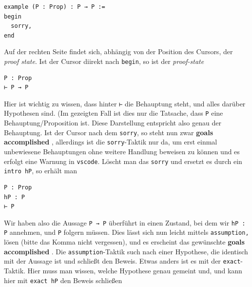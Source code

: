\documentclass[11pt]{article}
\newcommand{\leanin}{\texttt}
\newcommand{\leanstate}{\texttt}
\begin{document}
\begin{verbatim}
example (P : Prop) : P → P := 
begin
  sorry,
end
\end{verbatim}
Auf der rechten Seite findet sich, abhängig von der Position des Cursors, der {\em proof state}. Ist der Cursor diirekt nach \leanstate{begin}, so ist der {\em proof-state}
\begin{verbatim}
P : Prop
⊢ P → P
\end{verbatim}
Hier ist wichtig zu wissen, dass hinter \leanstate{⊢} die Behauptung steht, und alles darüber Hypothesen sind. (Im gezeigten Fall ist dies nur die Tatsache, dass \leanstate{P} eine Behauptung/Proposition ist. Diese Darstellung entspricht also genau der Behauptung. Ist der Cursor nach dem \leanin{sorry}, so steht nun zwar {\bf goals accomplished }, allerdings ist die \leanin{sorry}-Taktik nur da, um erst einmal unbewiesene Behauptungen ohne weitere Handlung beweisen zu können und es erfolgt eine Warnung in {\tt vscode}. Löscht man das \leanin{sorry} und ersetzt es durch ein \leanin{intro hP}, so erhält man
\begin{verbatim}
P : Prop
hP : P
⊢ P
\end{verbatim}
Wir haben also die Aussage \leanstate{P → P} überführt in einen Zustand, bei dem wir \leanstate{hP : P} annehmen, und \leanstate{P} folgern müssen. Dies lässt sich nun leicht mittels \leanin{assumption,} lösen (bitte das Komma nicht vergessen), und es erscheint das gewünschte {\bf goals accomplished }. Die \leanin{assumption}-Taktik such nach einer Hypothese, die identisch mit der Aussage ist und schließt den Beweis. Etwas anders ist es mit der \leanin{exact}-Taktik. Hier muss man wissen, welche Hypothese genau gemeint und, und kann hier mit \leanin{exact hP} den Beweis schließen
\end{document}

